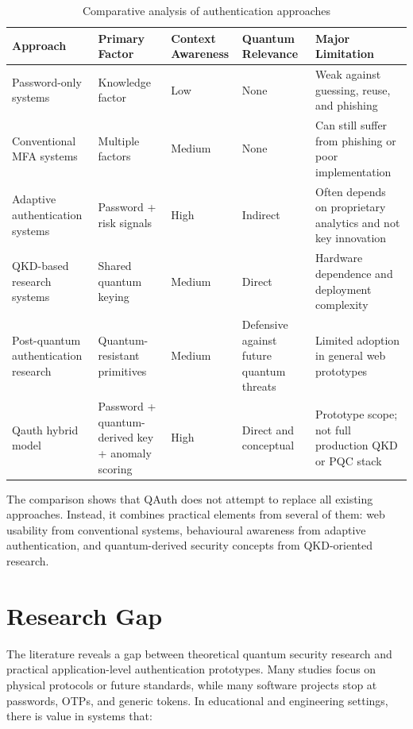 \documentclass[12pt,a4paper]{report}
\begin{document}
\begin{table}[H]
\centering
\small
\caption{Comparative analysis of authentication approaches}
\label{tab:literature-comparison}
\begin{tabular}{|p{3.1cm}|p{2.2cm}|p{2.4cm}|p{2.5cm}|p{3.3cm}|}
\hline
\textbf{Approach} & \textbf{Primary Factor} & \textbf{Context Awareness} & \textbf{Quantum Relevance} & \textbf{Major Limitation} \\
\hline
Password-only systems & Knowledge factor & Low & None & Weak against guessing, reuse, and phishing \\
\hline
Conventional MFA systems & Multiple factors & Medium & None & Can still suffer from phishing or poor implementation \\
\hline
Adaptive authentication systems & Password + risk signals & High & Indirect & Often depends on proprietary analytics and not key innovation \\
\hline
QKD-based research systems & Shared quantum keying & Medium & Direct & Hardware dependence and deployment complexity \\
\hline
Post-quantum authentication research & Quantum-resistant primitives & Medium & Defensive against future quantum threats & Limited adoption in general web prototypes \\
\hline
Qauth hybrid model & Password + quantum-derived key + anomaly scoring & High & Direct and conceptual & Prototype scope; not full production QKD or PQC stack \\
\hline
\end{tabular}
\end{table}

The comparison shows that QAuth does not attempt to replace all existing approaches. Instead, it combines practical elements from several of them: web usability from conventional systems, behavioural awareness from adaptive authentication, and quantum-derived security concepts from QKD-oriented research.

\section{Research Gap}
The literature reveals a gap between theoretical quantum security research and practical application-level authentication prototypes. Many studies focus on physical protocols or future standards, while many software projects stop at passwords, OTPs, and generic tokens. In educational and engineering settings, there is value in systems that:
\end{document}
